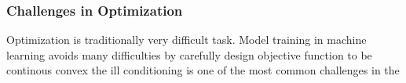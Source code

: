 \subsubsection{Challenges in Optimization}

Optimization is traditionally very difficult task. Model training in machine learning avoids many difficulties by carefully design objective function to be continous convex 
the ill conditioning is one of the most common challenges in the 
